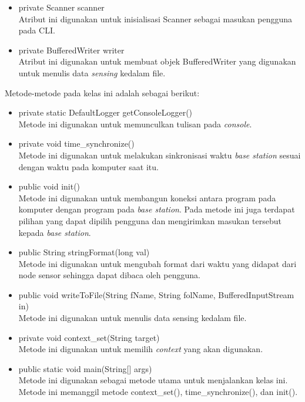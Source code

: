 \begin{itemize}
\begin{itemize}
\begin{itemize}
            \item private Scanner scanner\\
            Atribut ini digunakan untuk inisialisasi Scanner sebagai masukan pengguna pada CLI.
            \item private BufferedWriter writer\\
            Atribut ini digunakan untuk membuat objek BufferedWriter yang digunakan untuk menulis data \textit{sensing} kedalam file.
        \end{itemize}
        Metode-metode pada kelas ini adalah sebagai berikut:
        \begin{itemize}
            \item private static DefaultLogger getConsoleLogger()\\
            Metode ini digunakan untuk memunculkan tulisan pada \textit{console}.
            \item private void time\_synchronize()\\
            Metode ini digunakan untuk melakukan sinkronisasi waktu \textit{base station} sesuai dengan waktu pada komputer saat itu.
            \item public void init()\\
            Metode ini digunakan untuk membangun koneksi antara program pada komputer dengan program pada \textit{base station}. Pada metode ini juga terdapat pilihan yang dapat dipilih pengguna dan mengirimkan masukan tersebut kepada \textit{base station}.
            \item public String stringFormat(long val)\\
            Metode ini digunakan untuk mengubah format dari waktu yang didapat dari node sensor sehingga dapat dibaca oleh pengguna.
            \item public void writeToFile(String fName, String folName, BufferedInputStream in)\\
            Metode ini digunakan untuk menulis data sensing kedalam file.
            \item private void context\_set(String target)\\
            Metode ini digunakan untuk memilih \textit{context} yang akan digunakan.
            \item public static void main(String[] args)\\
            Metode ini digunakan sebagai metode utama untuk menjalankan kelas ini. Metode ini memanggil metode context\_set(), time\_synchronize(), dan init().
        \end{itemize}
    \end{itemize}
\end{itemize}

